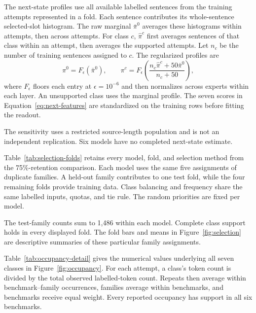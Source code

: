 The next-state profiles use all available labelled sentences from the training attempts represented in a fold.
%
Each sentence contributes its whole-sentence selected-slot histogram.
%
The raw marginal $\bar\pi^0$ averages these histograms within attempts, then across attempts.
%
For class $c$, $\widehat\pi^c$ first averages sentences of that class within an attempt, then averages the supported attempts.
%
Let $n_c$ be the number of training sentences assigned to $c$.
%
The regularized profiles are
\begin{equation}
 \pi^0=F_\epsilon(\bar\pi^0),\qquad
 \pi^c=F_\epsilon\!\left(
 \frac{n_c\widehat\pi^c+50\bar\pi^0}{n_c+50}\right),
\label{eq:routing-profiles}
\end{equation}
where $F_\epsilon$ floors each entry at $\epsilon=10^{-6}$ and then normalizes across experts within each layer.
%
An unsupported class uses the marginal profile.
%
The seven scores in Equation~\ref{eq:next-features} are standardized on the training rows before fitting the readout.
%

The sensitivity uses a restricted source-length population and is not an independent replication.
%
Six models have no completed next-state estimate.

\FloatBarrier
{}

Table~\ref{tab:selection-folds} retains every model, fold, and selection method from the 75\%-retention comparison.
%
Each model uses the same five assignments of duplicate families.
%
A held-out family contributes to one test fold, while the four remaining folds provide training data.
%
Class balancing and frequency share the same labelled inputs, quotas, and tie rule.
%
The random priorities are fixed per model.
%



The test-family counts sum to 1,486 within each model.
%
Complete class support holds in every displayed fold.
%
The fold bars and means in Figure~\ref{fig:selection} are descriptive summaries of these particular family assignments.
%


Table~\ref{tab:occupancy-detail} gives the numerical values underlying all seven classes in Figure~\ref{fig:occupancy}.
%
For each attempt, a class's token count is divided by the total observed labelled-token count.
%
Repeats then average within benchmark--family occurrences, families average within benchmarks, and benchmarks receive equal weight.
%
Every reported occupancy has support in all six benchmarks.
%

